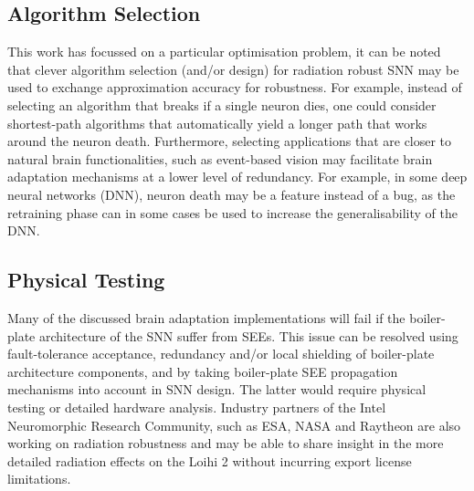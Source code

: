 \subsection{Algorithm Selection}\label{subsec:algorithm_selection}
This work has focussed on a particular optimisation problem, it can be noted that clever algorithm selection (and/or design) for radiation robust SNN may be used to exchange approximation accuracy for robustness. For example, instead of selecting an algorithm that breaks if a single neuron dies, one could consider shortest-path algorithms that automatically yield a longer path that works around the neuron death. Furthermore, selecting applications that are closer to natural brain functionalities, such as event-based vision may facilitate brain adaptation mechanisms at a lower level of redundancy. For example, in some deep neural networks (DNN), neuron death may be a feature instead of a bug, as the retraining phase can in some cases be used to increase the generalisability of the DNN. %

\subsection{Physical Testing}\label{subsec:physical testing}
Many of the discussed brain adaptation implementations will fail if the boiler-plate architecture of the SNN suffer from SEEs. This issue can be resolved using fault-tolerance acceptance, redundancy and/or local shielding of boiler-plate architecture components, and by taking boiler-plate SEE propagation mechanisms into account in SNN design. The latter would require physical testing or detailed hardware analysis. Industry partners of the Intel Neuromorphic Research Community, such as ESA, NASA and Raytheon are also working on radiation robustness \cite{inrc_meeting} and may be able to share insight in the more detailed radiation effects on the Loihi 2 without incurring export license limitations.